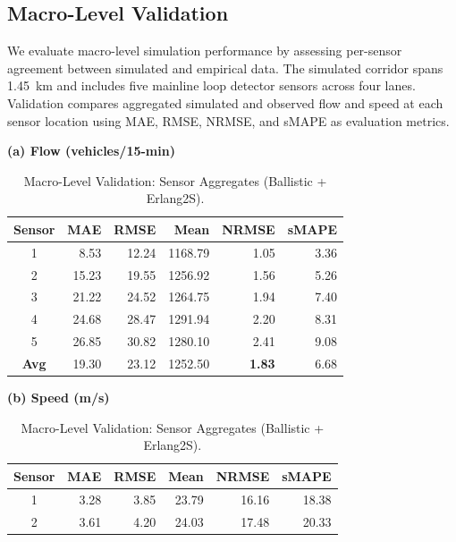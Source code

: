 \documentclass{scspaperproc}
\theoremstyle{scsthe}
\begin{document}
\subsection{Macro-Level Validation}
We evaluate macro-level simulation performance by assessing per-sensor agreement between simulated and empirical data. The simulated corridor spans 1.45~km and includes five mainline loop detector sensors across four lanes. Validation compares aggregated simulated and observed flow and speed at each sensor location using MAE, RMSE, NRMSE, and sMAPE as evaluation metrics.
\begin{table}[H]
    \centering
    \caption{Macro-Level Validation: Sensor Aggregates (Ballistic + Erlang2S).}
    \label{tab:macro-validation}
    \scriptsize
    \setlength{\tabcolsep}{6pt}
    \begin{minipage}{0.48\textwidth}
        \centering
        \textbf{(a) Flow (vehicles/15-min)}\\[0.5em]
        \begin{tabular}{crrrrr}
            \hline
            \textbf{Sensor} & \textbf{MAE} & \textbf{RMSE} & \textbf{Mean} & \textbf{NRMSE} & \textbf{sMAPE} \\
            \hline
            1 & 8.53 & 12.24 & 1168.79 & 1.05 & 3.36 \\
            2 & 15.23 & 19.55 & 1256.92 & 1.56 & 5.26 \\
            3 & 21.22 & 24.52 & 1264.75 & 1.94 & 7.40 \\
            4 & 24.68 & 28.47 & 1291.94 & 2.20 & 8.31 \\
            5 & 26.85 & 30.82 & 1280.10 & 2.41 & 9.08 \\
            \hline
            \textbf{Avg} & 19.30 & 23.12 & 1252.50 & \textbf{1.83} & 6.68 \\
            \hline
        \end{tabular}
    \end{minipage}
    \hfill
    \begin{minipage}{0.48\textwidth}
        \centering
        \textbf{(b) Speed (m/s)}\\[0.5em]
        \begin{tabular}{crrrrr}
            \hline
            \textbf{Sensor} & \textbf{MAE} & \textbf{RMSE} & \textbf{Mean} & \textbf{NRMSE} & \textbf{sMAPE} \\
            \hline
            1 & 3.28 & 3.85 & 23.79 & 16.16 & 18.38 \\
            2 & 3.61 & 4.20 & 24.03 & 17.48 & 20.33 \\

\end{tabular}
\end{minipage}
\end{table}
\end{document}
